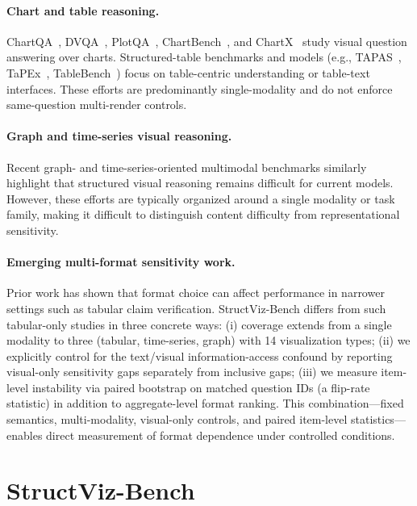 \documentclass{article}
\begin{document}
\paragraph{Chart and table reasoning.}
ChartQA~\citep{masry2022chartqa}, DVQA~\citep{kafle2018dvqa}, PlotQA~\citep{methani2020plotqa}, ChartBench~\citep{chartbench2023}, and ChartX~\citep{chartx2024} study visual question answering over charts. Structured-table benchmarks and models (e.g., TAPAS~\citep{herzig2020tapas}, TaPEx~\citep{liu2021tapex}, TableBench~\citep{tablebench2024}) focus on table-centric understanding or table-text interfaces. These efforts are predominantly single-modality and do not enforce same-question multi-render controls.

\paragraph{Graph and time-series visual reasoning.}
Recent graph- and time-series-oriented multimodal benchmarks similarly highlight that structured visual reasoning remains difficult for current models. However, these efforts are typically organized around a single modality or task family, making it difficult to distinguish content difficulty from representational sensitivity.

\paragraph{Emerging multi-format sensitivity work.}
Prior work has shown that format choice can affect performance in narrower settings such as tabular claim verification. StructViz-Bench differs from such tabular-only studies in three concrete ways:
(i) coverage extends from a single modality to three (tabular, time-series, graph) with 14 visualization types;
(ii) we explicitly control for the text/visual information-access confound by reporting visual-only sensitivity gaps separately from inclusive gaps;
(iii) we measure item-level instability via paired bootstrap on matched question IDs (a flip-rate statistic) in addition to aggregate-level format ranking.
This combination---fixed semantics, multi-modality, visual-only controls, and paired item-level statistics---enables direct measurement of format dependence under controlled conditions.

\section{StructViz-Bench}
\end{document}
